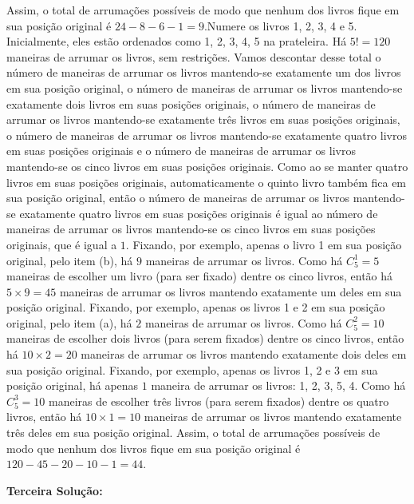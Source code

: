 \documentclass[oneside,a4paper,12pt]{article}
\newcommand{\negrito}[1]{\mbox{\boldmath{$#1$}}}
\theoremstyle{Colorido}
\theoremstyle{solu}
\theoremstyle{dotlessP}
\begin{document}
{\begin{tasks}[counter-format={(tsk[a])},label-width=3.6ex, label-format = {\bfseries}, column-sep = {20pt}]
Assim, o total de arrumações possíveis de modo que nenhum dos livros fique em sua posição original é $24-8-6-1=9$.\task[\textcolor{blue}{$\negrito{(c)} $}] Numere os livros 1, 2, 3, 4 e 5. Inicialmente, eles estão ordenados como 1, 2, 3, 4, 5 na prateleira. Há $5!=120$ maneiras de arrumar os livros, sem restrições. Vamos descontar desse total o número de maneiras de arrumar os livros mantendo-se exatamente um dos livros em sua posição original, o número de maneiras de arrumar os livros mantendo-se exatamente dois livros em suas posições originais, o número de maneiras de arrumar os livros mantendo-se exatamente três livros em suas posições originais, o número de maneiras de arrumar os livros mantendo-se exatamente quatro livros em suas posições originais e o número de maneiras de arrumar os livros mantendo-se os cinco livros em suas posições originais. Como ao se manter quatro livros em suas posições originais, automaticamente o quinto livro também fica em sua posição original, então o número de maneiras de arrumar os livros mantendo-se exatamente quatro livros em suas posições originais é igual ao número de maneiras de arrumar os livros mantendo-se os cinco livros em suas posições originais, que é igual a $1$. Fixando, por exemplo, apenas o livro 1 em sua posição original, pelo item (b), há $9$ maneiras de arrumar os livros. Como há $C_5^1=5$ maneiras de escolher um livro (para ser fixado) dentre os cinco livros, então há $5\times9=45$ maneiras de arrumar os livros mantendo exatamente um deles em sua posição original. Fixando, por exemplo, apenas os livros 1 e 2 em sua posição original, pelo item (a), há $2$ maneiras de arrumar os livros. Como há $C_5^2=10$ maneiras de escolher dois livros (para serem fixados) dentre os cinco livros, então há $10\times2=20$ maneiras de arrumar os livros mantendo exatamente dois deles em sua posição original. Fixando, por exemplo, apenas os livros 1, 2 e 3 em sua posição original, há apenas $1$ maneira de arrumar os livros: 1, 2, 3, 5, 4. Como há $C_5^3=10$ maneiras de escolher três livros (para serem fixados) dentre os quatro livros, então há $10\times1=10$ maneiras de arrumar os livros mantendo exatamente três deles em sua posição original. Assim, o total de arrumações possíveis de modo que nenhum dos livros fique em sua posição original é $120-45-20-10-1=44$.\end{tasks}\textbf{Terceira Solução:}
}
\end{document}
